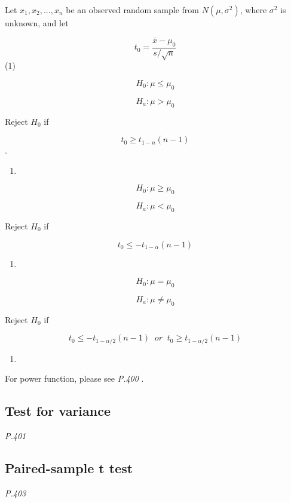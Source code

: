\documentclass[]{book}
\begin{document}
Let \(x_1,x_2,...,x_n\) be an observed random sample from \(N(\mu,\sigma^2)\), where \(\sigma^2\) is unknown, and let

\[t_0=\frac{\bar{x}-\mu_0}{s/\sqrt{n}}\]
(1)

\[H_0: \mu \leq \mu_0\]

\[H_a: \mu > \mu_0\]

Reject \(H_0\) if

\[t_0 \geq t_{1-n}(n-1)\].

\begin{enumerate}
\def\labelenumi{(\arabic{enumi})}
\setcounter{enumi}{1}
\item
\end{enumerate}

\[H_0: \mu \geq \mu_0\]

\[H_a: \mu < \mu_0\]

Reject \(H_0\) if

\[t_0 \leq -t_{1-\alpha}(n-1)\]

\begin{enumerate}
\def\labelenumi{(\arabic{enumi})}
\setcounter{enumi}{2}
\item
\end{enumerate}

\[H_0: \mu = \mu_0\]

\[H_a: \mu \neq \mu_0\]

Reject \(H_0\) if

\[t_0 \leq -t_{1-\alpha/2}(n-1) \;\; or \; \; t_0 \geq t_{1-\alpha/2}(n-1)\]

\begin{enumerate}
\def\labelenumi{(\arabic{enumi})}
\setcounter{enumi}{3}
\item
\end{enumerate}

For power function, please see \emph{P.400} .

\hypertarget{test-for-variance}{%
\subsection{Test for variance}\label{test-for-variance}}

\emph{P.401}

\hypertarget{paired-sample-t-test}{%
\subsection{Paired-sample t test}\label{paired-sample-t-test}}

\emph{P.403}
\end{document}
